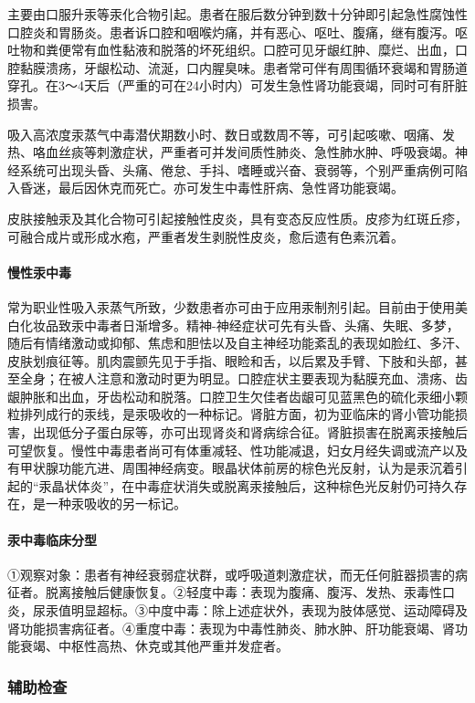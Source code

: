 主要由口服升汞等汞化合物引起。患者在服后数分钟到数十分钟即引起急性腐蚀性口腔炎和胃肠炎。患者诉口腔和咽喉灼痛，并有恶心、呕吐、腹痛，继有腹泻。呕吐物和粪便常有血性黏液和脱落的坏死组织。口腔可见牙龈红肿、糜烂、出血，口腔黏膜溃疡，牙龈松动、流涎，口内腥臭味。患者常可伴有周围循环衰竭和胃肠道穿孔。在3～4天后（严重的可在24小时内）可发生急性肾功能衰竭，同时可有肝脏损害。

吸入高浓度汞蒸气中毒潜伏期数小时、数日或数周不等，可引起咳嗽、咽痛、发热、咯血丝痰等刺激症状，严重者可并发间质性肺炎、急性肺水肿、呼吸衰竭。神经系统可出现头昏、头痛、倦怠、手抖、嗜睡或兴奋、衰弱等，个别严重病例可陷入昏迷，最后因休克而死亡。亦可发生中毒性肝病、急性肾功能衰竭。

皮肤接触汞及其化合物可引起接触性皮炎，具有变态反应性质。皮疹为红斑丘疹，可融合成片或形成水疱，严重者发生剥脱性皮炎，愈后遗有色素沉着。

\paragraph{慢性汞中毒}

常为职业性吸入汞蒸气所致，少数患者亦可由于应用汞制剂引起。目前由于使用美白化妆品致汞中毒者日渐增多。精神-神经症状可先有头昏、头痛、失眠、多梦，随后有情绪激动或抑郁、焦虑和胆怯以及自主神经功能紊乱的表现如脸红、多汗、皮肤划痕征等。肌肉震颤先见于手指、眼睑和舌，以后累及手臂、下肢和头部，甚至全身；在被人注意和激动时更为明显。口腔症状主要表现为黏膜充血、溃疡、齿龈肿胀和出血，牙齿松动和脱落。口腔卫生欠佳者齿龈可见蓝黑色的硫化汞细小颗粒排列成行的汞线，是汞吸收的一种标记。肾脏方面，初为亚临床的肾小管功能损害，出现低分子蛋白尿等，亦可出现肾炎和肾病综合征。肾脏损害在脱离汞接触后可望恢复。慢性中毒患者尚可有体重减轻、性功能减退，妇女月经失调或流产以及有甲状腺功能亢进、周围神经病变。眼晶状体前房的棕色光反射，认为是汞沉着引起的“汞晶状体炎”，在中毒症状消失或脱离汞接触后，这种棕色光反射仍可持久存在，是一种汞吸收的另一标记。

\paragraph{汞中毒临床分型}

①观察对象：患者有神经衰弱症状群，或呼吸道刺激症状，而无任何脏器损害的病征者。脱离接触后健康恢复。②轻度中毒：表现为腹痛、腹泻、发热、汞毒性口炎，尿汞值明显超标。③中度中毒：除上述症状外，表现为肢体感觉、运动障碍及肾功能损害病征者。④重度中毒：表现为中毒性肺炎、肺水肿、肝功能衰竭、肾功能衰竭、中枢性高热、休克或其他严重并发症者。

\subsubsection{辅助检查}

